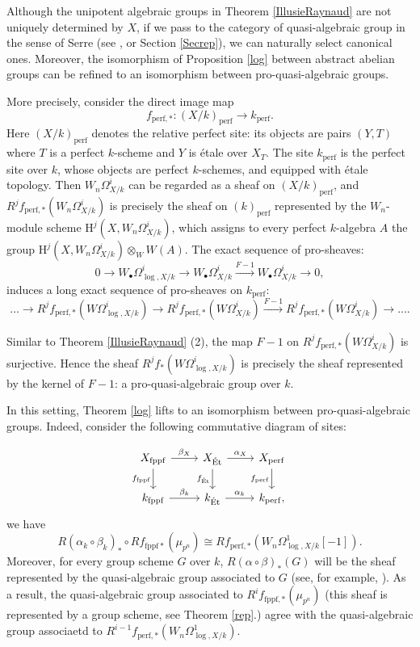 \documentclass[a4paper,12pt,twoside]{report}
\newcommand{\fppf}{\mathrm{fppf}}
\newcommand{\Et}{\mathrm{\acute{E}t}}
\newcommand{\HH}{\mathrm{H}}
\newcommand{\perf}{\mathrm{perf}}
\begin{document}
Although the unipotent algebraic groups in Theorem \ref{IllusieRaynaud} are not uniquely determined by $X$, 
if we pass to the category of quasi-algebraic group in the sense of Serre (see \cite{Se}, or Section \ref{Secrep}),
we can naturally select canonical ones. 
Moreover, the isomorphism of Proposition \ref{log} between abstract abelian groups 
can be refined to an isomorphism between pro-quasi-algebraic groups. 

More precisely, consider the direct image map 
\[f_{\perf,*}: (X/k)_{\perf}\rightarrow k_{\perf}.\]
Here \((X/k)_{\perf}\) denotes the relative perfect site: 
its objects are pairs \((Y,T)\) where \(T\) is a perfect \(k\)-scheme and 
\(Y\) is \'etale over \(X_T\). The site \(k_{\perf}\) is the perfect site over \(k\), 
whose objects are perfect \(k\)-schemes, and equipped with \'etale topology. 
Then \(W_n\Omega_{X/k}^i\) can be regarded as a sheaf on \((X/k)_{\perf}\), and 
\(R^jf_{\perf,*}(W_n\Omega_{X/k}^i)\) is precisely the sheaf on 
\((k)_{\perf}\) represented by the \(W_n\)-module scheme 
\(\HH^j(X,W_n\Omega^i_{X/k})\), 
which assigns to every perfect \(k\)-algebra \(A\) the group \(\HH^j(X,W_n\Omega^i_{X/k})\otimes_{W}W(A)\). 
The exact sequence of pro-sheaves: 
\[0\rightarrow W_{\bullet}\Omega^i_{\log,X/k} \rightarrow W_\bullet\Omega^i_{X/k} \xrightarrow{F-1}  W_\bullet\Omega^i_{X/k} \rightarrow 0,\]
induces a long exact sequence of pro-sheaves on \(k_{\perf}\): 
\[...\rightarrow R^jf_{\perf,*}(W\Omega^i_{\log,X/k})\rightarrow R^jf_{\perf,*}(W\Omega_{X/k}^i) \xrightarrow{F-1}R^jf_{\perf,*}(W\Omega_{X/k}^i) \rightarrow....\]

Similar to Theorem \ref{IllusieRaynaud} (2), the map \(F-1\) on \(R^jf_{\perf,*}(W\Omega_{X/k}^i)\) is surjective. 
Hence the sheaf \(R^jf_*(W\Omega^i_{\log,X/k})\) is precisely the sheaf represented by the kernel of \(F-1\): 
a pro-quasi-algebraic group over \(k\). 

In this setting, Theorem \ref{log} lifts to an isomorphism between pro-quasi-algebraic groups. 
Indeed, consider the following commutative diagram of sites:  

\[\begin{tikzcd}
	{X_{\fppf}} & {X_{\Et}} & {X_{\perf}} \\
	{k_{\fppf}} & {k_{\Et}} & {k_{\perf},}
	\arrow["{\beta_X}", from=1-1, to=1-2]
	\arrow["{f_{\fppf}}"', from=1-1, to=2-1]
	\arrow["{\alpha_X}", from=1-2, to=1-3]
	\arrow["{f_{\Et}}"', from=1-2, to=2-2]
	\arrow["{f_{\perf}}"', from=1-3, to=2-3]
	\arrow["{\beta_{k}}", from=2-1, to=2-2]
	\arrow["{\alpha_k}", from=2-2, to=2-3]
\end{tikzcd}\]
we have \[R(\alpha_{k}\circ\beta_k)_*\circ Rf_{\fppf *}(\mu_{p^n})\cong Rf_{\perf,*}(W_n\Omega^1_{\log,X/k}[-1]).\]
Moreover, for every group scheme \(G\) over \(k\), \(R(\alpha\circ\beta)_*(G)\) will be the sheaf represented by the quasi-algebraic group associated to \(G\) (see, for example, \cite[p. 221]{Be}). 
As a result, the quasi-algebraic group associated to \(R^if_{\fppf,*}(\mu_{p^n})\) 
(this sheaf is represented by a group scheme, see Theorem \ref{rep}.)
agree with the quasi-algebraic group associaetd to \(R^{i-1}f_{\perf,*}(W_n\Omega^1_{\log,X/k})\). 
\end{document}
